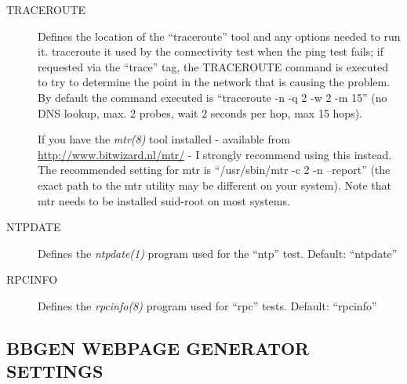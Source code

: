 \begin{description}
 

\item[TRACEROUTE] Defines the location of the ``traceroute'' tool and any options needed to run it. traceroute it used by the connectivity test when the ping test fails; if requested via the ``trace'' tag, the TRACEROUTE command is executed to try to determine the point in the network that is causing the problem. By default the command executed is ``traceroute -n -q 2 -w 2 -m 15'' (no DNS lookup, max. 2 probes, wait 2 seconds per hop, max 15 hops). 

  If you have the \emph{mtr(8)}
 tool installed - available from \url{http://www.bitwizard.nl/mtr/} - I strongly recommend using this instead. The recommended setting for mtr is ``/usr/sbin/mtr -c 2 -n --report'' (the exact path to the mtr utility may be different on your system). Note that mtr needs to be installed suid-root on most systems. 


 

\item[NTPDATE] Defines the \emph{ntpdate(1)}
 program used for the ``ntp'' test. Default: ``ntpdate'' 

 

\item[RPCINFO] Defines the \emph{rpcinfo(8)}
 program used for ``rpc'' tests. Default: ``rpcinfo'' 

 


 


\end{description}

\subsection{BBGEN WEBPAGE GENERATOR SETTINGS}



